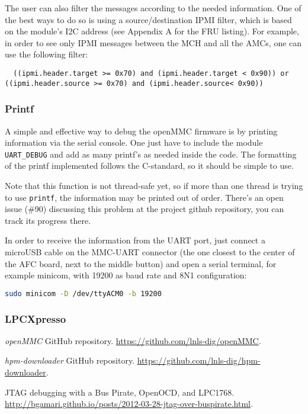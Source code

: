 \documentclass[letterpaper,12pt, titlepage]{article}
\begin{document}
The user can also filter the messages according to the needed information. One of the best ways to do so is using a source/destination IPMI filter, which is based on the module's I2C address (see Appendix A for the FRU listing). For example, in order to see only IPMI messages between the MCH and all the AMCs, one can use the following filter:

\begin{lstlisting}
  ((ipmi.header.target >= 0x70) and (ipmi.header.target < 0x90)) or ((ipmi.header.source >= 0x70) and (ipmi.header.source< 0x90))
\end{lstlisting}


\subsubsection{Printf}
A simple and effective way to debug the openMMC firmware is by printing information via the serial console. One just have to include the module \texttt{UART\_DEBUG} and add as many printf's as needed inside the code. The formatting of the printf implemented follows the C-standard, so it should be simple to use.

Note that this function is not thread-safe yet, so if more than one thread is trying to use \texttt{printf}, the information may be printed out of order. There's an open issue (\#90) discussing this problem at the project github repository, you can track its progress there.

In order to receive the information from the UART port, just connect a microUSB cable on the MMC-UART connector (the one closest to the center of the AFC board, next to the middle button) and open a serial terminal, for example minicom, with 19200 as baud rate and 8N1 configuration:

\begin{lstlisting}[language=bash]
  sudo minicom -D /dev/ttyACM0 -b 19200
\end{lstlisting}

\subsubsection{LPCXpresso}

\newpage
\begin{thebibliography}{99}

 \emph{openMMC} GitHub repository. \url{https://github.com/lnls-dig/openMMC}.

 \emph{hpm-downloader} GitHub repository. \url{https://github.com/lnls-dig/hpm-downloader}.

 JTAG debugging with a Bus Pirate, OpenOCD, and LPC1768. \url{http://bgamari.github.io/posts/2012-03-28-jtag-over-buspirate.html}.

\end{thebibliography}
\end{document}
